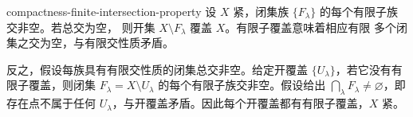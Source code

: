 \begin{solution}{compactness-finite-intersection-property}
设 \(X\) 紧，闭集族 \(\{F_\lambda\}\) 的每个有限子族交非空。若总交为空，
则开集 \(X\setminus F_\lambda\) 覆盖 \(X\)。有限子覆盖意味着相应有限
多个闭集之交为空，与有限交性质矛盾。

反之，假设每族具有有限交性质的闭集总交非空。给定开覆盖
\(\{U_\lambda\}\)，若它没有有限子覆盖，则闭集
\(F_\lambda=X\setminus U_\lambda\) 的每个有限子族交非空。假设给出
\(\bigcap_\lambda F_\lambda\ne\varnothing\)，即存在点不属于任何
\(U_\lambda\)，与开覆盖矛盾。因此每个开覆盖都有有限子覆盖，\(X\) 紧。
\end{solution}
